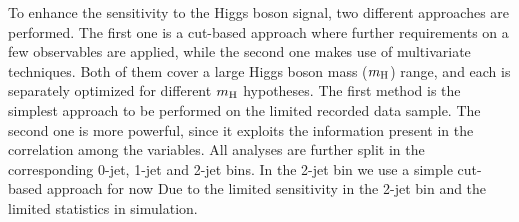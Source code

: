 To enhance the sensitivity to the Higgs boson signal, two different approaches 
are performed. The first one is a cut-based approach where further requirements 
on a few observables are applied, while the second one makes use of
multivariate techniques. Both of them cover a large Higgs boson mass
($m_{\rm{H}}$) range, and each is separately optimized for different
$m_{\rm{H}}$ hypotheses. The first method is the simplest approach to
be performed on the limited recorded data sample. The second one is
more powerful, since it exploits the information present in the
correlation among the variables. All analyses are further split in 
the corresponding 0-jet, 1-jet and 2-jet bins. In the 2-jet bin we use 
a simple cut-based approach for now Due to the limited 
sensitivity in the 2-jet bin and the limited statistics in simulation. 


